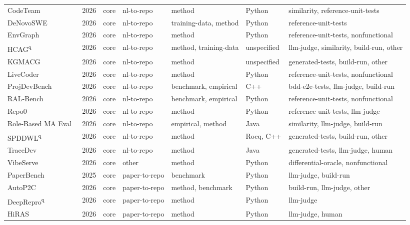 {\begin{longtable}{@{}p{2.8cm}lllp{1.9cm}p{1.5cm}p{2.9cm}@{}}
CodeTeam~\cite{CodeTeam2026} & 2026 & core & nl-to-repo & method & Python & similarity, reference-unit-tests \\
DeNovoSWE~\cite{DeNovoSWE2026} & 2026 & core & nl-to-repo & training-data, method & Python & reference-unit-tests \\
EnvGraph~\cite{EnvGraph2026} & 2026 & core & nl-to-repo & method & Python & reference-unit-tests, nonfunctional \\
HCAG\textsuperscript{q}~\cite{HCAG2026} & 2026 & core & nl-to-repo & method, training-data & unspecified & llm-judge, similarity, build-run, other \\
KGMACG~\cite{KGMACG2026} & 2026 & core & nl-to-repo & method & unspecified & generated-tests, build-run, other \\
LiveCoder~\cite{LiveCoder2026} & 2026 & core & nl-to-repo & method & Python & reference-unit-tests, nonfunctional \\
ProjDevBench~\cite{ProjDevBench2026} & 2026 & core & nl-to-repo & benchmark, empirical & C++ & bdd-e2e-tests, llm-judge, build-run \\
RAL-Bench~\cite{RALBench2026} & 2026 & core & nl-to-repo & benchmark, empirical & Python & reference-unit-tests, nonfunctional \\
Repo0~\cite{Repo02026} & 2026 & core & nl-to-repo & method & Python & reference-unit-tests, llm-judge \\
Role-Based MA Eval~\cite{RoleBasedMAEval2026} & 2026 & core & nl-to-repo & empirical, method & Java & similarity, llm-judge, build-run \\
SPDDWL\textsuperscript{q}~\cite{SPDDWL2026} & 2026 & core & nl-to-repo & method & Rocq, C++ & generated-tests, build-run, other \\
TraceDev~\cite{TraceDev2026} & 2026 & core & nl-to-repo & method & Java & generated-tests, llm-judge, human \\
VibeServe~\cite{VibeServe2026} & 2026 & core & other & method & Python & differential-oracle, nonfunctional \\
PaperBench~\cite{PaperBench2025} & 2025 & core & paper-to-repo & benchmark & Python & llm-judge, build-run \\
AutoP2C~\cite{AutoP2C2026} & 2026 & core & paper-to-repo & method, benchmark & Python & build-run, llm-judge, other \\
DeepRepro\textsuperscript{q}~\cite{DeepRepro2026} & 2026 & core & paper-to-repo & method & Python & llm-judge \\
HiRAS~\cite{HiRAS2026} & 2026 & core & paper-to-repo & method & Python & llm-judge, human \\

\end{longtable}}
